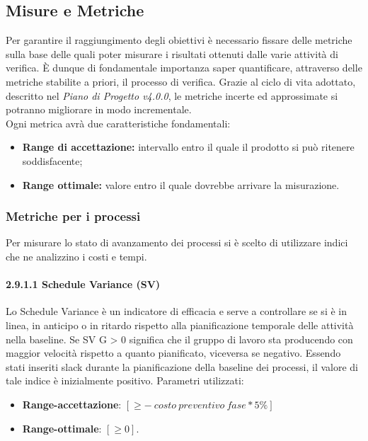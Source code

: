 \subsection{Misure e Metriche}
Per garantire il raggiungimento degli obiettivi è necessario fissare delle metriche sulla base delle quali poter misurare i risultati ottenuti dalle varie attività di verifica. È dunque di fondamentale importanza saper quantificare, attraverso delle metriche stabilite a priori, il processo di verifica. Grazie al ciclo di vita adottato, descritto nel \textit{Piano di Progetto v4.0.0}, le metriche incerte ed approssimate si potranno migliorare in modo incrementale.\\
Ogni metrica avrà due caratteristiche fondamentali:
\begin{itemize}
	\item \textbf{Range di accettazione:} intervallo entro il quale il prodotto si può ritenere soddisfacente;
	\item \textbf{Range ottimale:} valore entro il quale dovrebbe arrivare la misurazione.
\end{itemize}

\subsubsection{Metriche per i processi}
\label{sezione 3.7}
Per misurare lo stato di avanzamento dei processi si è scelto di utilizzare indici che ne analizzino i costi e
tempi.
\paragraph{2.9.1.1 Schedule Variance (SV)}
Lo Schedule Variance è un indicatore di efficacia e serve a controllare se si è in linea, in anticipo o in ritardo rispetto alla pianificazione temporale delle attività nella baseline.
Se SV G > 0 significa che il gruppo di lavoro sta producendo con maggior velocità rispetto a quanto pianificato, viceversa se negativo.
Essendo stati inseriti slack durante la pianificazione della baseline dei processi, il valore di tale indice è inizialmente positivo.
Parametri utilizzati:
\begin{itemize}
	\item \textbf{Range-accettazione}: $\left[  \geq - \: costo \: preventivo \: fase * 5 \% \right]$
	\item \textbf{Range-ottimale}: $\left[\geq 0\right]$.
\end{itemize}
